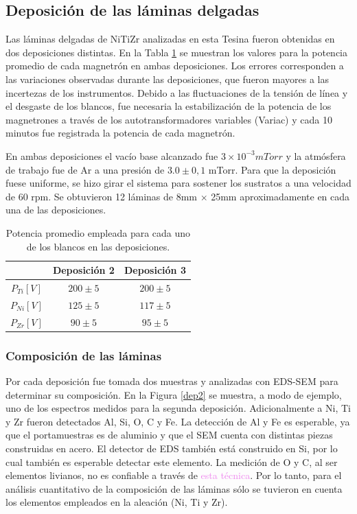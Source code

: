 \documentclass[12pt]{article}
\theoremstyle{definition}
\theoremstyle{remark}
\begin{document}
{\subsection{Deposición de las láminas delgadas}

Las láminas  delgadas de NiTiZr analizadas en esta Tesina fueron obtenidas en dos deposiciones distintas. En la Tabla \ref{potencias} se muestran los valores para la potencia promedio de cada magnetrón en ambas deposiciones. Los errores corresponden a las variaciones observadas durante las deposiciones, que fueron mayores a las incertezas de los instrumentos. Debido a las fluctuaciones de la tensión de línea y el desgaste de los blancos, fue necesaria la estabilización de la potencia de los magnetrones a través de los autotransformadores variables (Variac) y cada 10 minutos fue registrada la potencia de cada magnetrón.

En ambas deposiciones el vacío base alcanzado fue $3 \times 10^{-3}mTorr$ y la atmósfera de trabajo fue de Ar a una presión de $3.0 \pm 0,1$ mTorr. Para que la deposición fuese uniforme, se hizo girar el sistema para sostener los sustratos a una velocidad de 60 rpm. Se obtuvieron 12 láminas de 8mm $\times$ 25mm aproximadamente en cada una de las deposiciones.

\begin{table}[H]
\centering
\begin{tabular}{|c|c|c|}
\hline
 & Deposición 2 & Deposición 3 \\ \hline
$P_{Ti}[V]$ & $200 \pm 5$ & $200 \pm 5$ \\ \hline
$P_{Ni}[V]$ & $125 \pm 5$ & $117 \pm 5$ \\ \hline
$P_{Zr}[V]$ & $90 \pm 5$ & $95 \pm 5$ \\ \hline
\end{tabular}
\caption{Potencia promedio empleada para cada uno de los blancos en las deposiciones.}
\label{potencias}
\end{table}

\subsubsection{Composición de las láminas}

Por cada deposición fue tomada dos muestras y analizadas con EDS-SEM para determinar su composición. En la Figura \ref{dep2} se muestra, a modo de ejemplo, uno de los espectros medidos para la segunda deposición. Adicionalmente a Ni, Ti y Zr fueron detectados Al, Si, O, C y Fe. La detección de Al y Fe es esperable, ya que el portamuestras es de aluminio y que el SEM cuenta con distintas piezas construidas en acero. El detector de EDS también está construido en Si, por lo cual también es esperable detectar este elemento. La medición de O y C, al ser elementos livianos, no es confiable a través de \textcolor{violet}{esta técnica}. Por lo tanto, para el análisis cuantitativo de la composición de las láminas sólo se tuvieron en cuenta los elementos empleados en la aleación (Ni, Ti y Zr).

}
\end{document}
